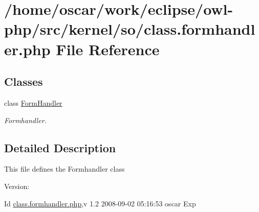 \hypertarget{class_8formhandler_8php}{
\section{/home/oscar/work/eclipse/owl-php/src/kernel/so/class.formhandler.php File Reference}
\label{class_8formhandler_8php}
}
\subsection*{Classes}
\begin{CompactItemize}
\item 
class \hyperlink{classFormHandler}{FormHandler}
\begin{CompactList}\small\item\em Formhandler. \item\end{CompactList}\end{CompactItemize}


\subsection{Detailed Description}
This file defines the Formhandler class \begin{Desc}
\item[Version:]\end{Desc}
\begin{Desc}
\item[Id]\hyperlink{class_8formhandler_8php}{class.formhandler.php},v 1.2 2008-09-02 05:16:53 oscar Exp \end{Desc}
